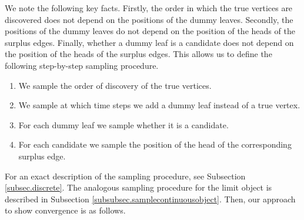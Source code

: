 We note the following key facts. Firstly, the order in which the true vertices are discovered does not depend on the positions of the dummy leaves. Secondly, the positions of the dummy leaves do not depend on the position of the heads of the surplus edges. Finally, whether a dummy leaf is a candidate does not depend on the position of the heads of the surplus edges. This allows us to define the following step-by-step sampling procedure.
\begin{enumerate}
    \item We sample the order of discovery of the true vertices.
    \item We sample at which time steps we add a dummy leaf instead of a true vertex. 
    \item For each dummy leaf we sample whether it is a candidate.
    \item For each candidate we sample the position of the head of the corresponding surplus edge.
\end{enumerate}
For an exact description of the sampling procedure, see Subsection \ref{subsec.discrete}. The analogous sampling procedure for the limit object is described in Subsection \ref{subsubsec.samplecontinuousobject}. Then, our approach to show convergence is as follows.


